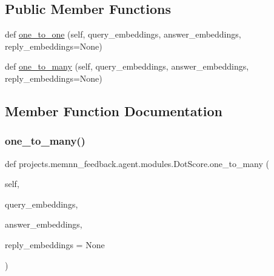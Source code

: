 \subsection*{Public Member Functions}
\begin{DoxyCompactItemize}
\item 
def \hyperlink{classprojects_1_1memnn__feedback_1_1agent_1_1modules_1_1DotScore_aa8bc1b8eefcd08b7e2bf4540a379ad41}{one\+\_\+to\+\_\+one} (self, query\+\_\+embeddings, answer\+\_\+embeddings, reply\+\_\+embeddings=None)
\item 
def \hyperlink{classprojects_1_1memnn__feedback_1_1agent_1_1modules_1_1DotScore_a0c541c0daa225e3a8cf4918068afa591}{one\+\_\+to\+\_\+many} (self, query\+\_\+embeddings, answer\+\_\+embeddings, reply\+\_\+embeddings=None)
\end{DoxyCompactItemize}


\subsection{Member Function Documentation}
\mbox{\label{classprojects_1_1memnn__feedback_1_1agent_1_1modules_1_1DotScore_a0c541c0daa225e3a8cf4918068afa591}} 
\subsubsection{\texorpdfstring{one\+\_\+to\+\_\+many()}{one\_to\_many()}}
{\footnotesize\ttfamily def projects.\+memnn\+\_\+feedback.\+agent.\+modules.\+Dot\+Score.\+one\+\_\+to\+\_\+many (\begin{DoxyParamCaption}\item[{}]{self,  }\item[{}]{query\+\_\+embeddings,  }\item[{}]{answer\+\_\+embeddings,  }\item[{}]{reply\+\_\+embeddings = {\ttfamily None} }\end{DoxyParamCaption})}

\mbox{\label{classprojects_1_1memnn__feedback_1_1agent_1_1modules_1_1DotScore_aa8bc1b8eefcd08b7e2bf4540a379ad41}} 
